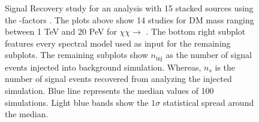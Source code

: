 \begin{figure}
    \caption{Signal Recovery study for an analysis with 15 stacked sources using the \GS \J-factors \cite{Geringer_Sameth_2015}. The plots above show 14 studies for DM mass ranging between 1 TeV and 20 PeV for $\chi\chi \rightarrow$ \parpar{\nu_\mu}. The bottom right subplot features every spectral model used as input for the remaining subplots. The remaining subplots show $n_\mathrm{inj}$ as the number of signal events injected into background simulation. Whereas, $n_s$ is the number of signal events recovered from analyzing the injected simulation. Blue line represents the median values of 100 simulations. Light blue bands show the $1\sigma$ statistical spread around the median.}
    \label{fig:icDM_sigrecovery_1of2}
\end{figure}


